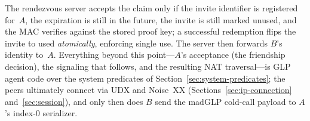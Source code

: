 The rendezvous server accepts the claim only if the invite identifier is registered for~$A$, the expiration is still in the future, the invite is still marked unused, and the MAC verifies against the stored proof key; a successful redemption flips the invite to used \emph{atomically}, enforcing single use.  The server then forwards $B$'s identity to~$A$.  Everything beyond this point---$A$'s acceptance (the friendship decision), the signaling that follows, and the resulting NAT traversal---is GLP agent code over the system predicates of Section~\ref{sec:system-predicates}; the peers ultimately connect via UDX and Noise~XX (Sections~\ref{sec:ip-connection} and~\ref{sec:session}), and only then does $B$ send the madGLP cold-call payload to $A$'s index-0 serializer.

